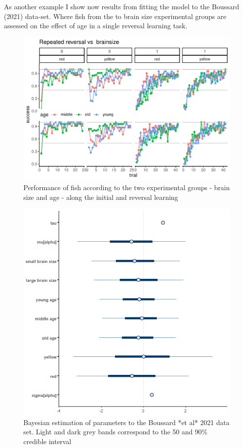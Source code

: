 \documentclass[
]{article}
\begin{document}
As another example I show now results from fitting the model to the
Boussard (2021) data-set. Where fish from the to brain size experimental
groups are assessed on the effect of age in a single reversal learning
task.

\begin{figure}

\includegraphics{report_files/figure-latex/unnamed-chunk-10-1} \hfill{}

\caption{Performance of fish according to the two experimental groups  - brain size and age - along the initial and reversal learning}\label{fig:unnamed-chunk-10}
\end{figure}

\begin{figure}

\includegraphics[width=6.67in,]{images/boussard2intervals_col} \hfill{}

\caption{Bayesian estimation of parameters to the Boussard *et al* 2021 data set. Light and dark grey bands correspond to the 50 and 90\% credible interval}\label{fig:unnamed-chunk-11}
\end{figure}
\end{document}
